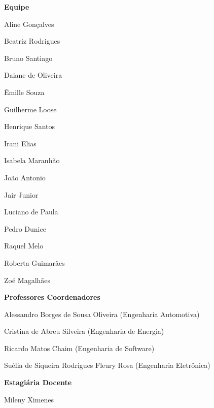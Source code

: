 \begin{center}
\textbf{\Large Equipe}
 
 \vspace{\onelineskip}
Aline Gonçalves

Beatriz Rodrigues

Bruno Santiago

Daiane de Oliveira

Êmille Souza

Guilherme Loose

Henrique Santos

Irani Elias

Isabela Maranhão

João Antonio

Jair Junior

Luciano de Paula

Pedro Dunice

Raquel Melo

Roberta Guimarães

Zoé Magalhães


 \vspace{\onelineskip}

\textbf{\Large Professores Coordenadores}

 \vspace{\onelineskip}

Alessandro Borges de Sousa Oliveira (Engenharia Automotiva)

Cristina de Abreu Silveira (Engenharia de Energia)

Ricardo Matos Chaim (Engenharia de Software)

Suélia de Siqueira Rodrigues Fleury Rosa (Engenharia Eletrônica)
 

 \vspace{\onelineskip}

\textbf{\large Estagiária Docente}

 \vspace{\onelineskip}

Mileny Ximenes

\end{center}



 \vspace{\onelineskip} 
 \vspace{\onelineskip}
 \vspace{\onelineskip}
 \vspace{\onelineskip}
 \vspace{\onelineskip}
 \vspace{\onelineskip}
 \vspace{\onelineskip}
 \vspace{\onelineskip}
 \vspace{\onelineskip} 
 \vspace{\onelineskip}
 \vspace{\onelineskip}
 \vspace{\onelineskip}
 \vspace{\onelineskip} 
 \vspace{\onelineskip} 
 \vspace{\onelineskip} 
 
